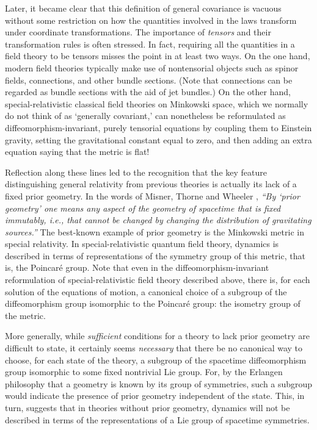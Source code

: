 Later, it became clear that this definition of general covariance
is vacuous without some restriction on how the quantities
involved in the laws transform under coordinate transformations.
The importance of {\it tensors} and their transformation rules is
often stressed.  In fact, requiring all the quantities in a field
theory to be tensors misses the point in at least two ways.  On
the one hand, modern field theories typically make use of
nontensorial objects such as spinor fields, connections, and
other bundle sections. (Note that connections can be regarded as
bundle sections with the aid of jet bundles.)  On the other hand,
special-relativistic classical field theories on Minkowski space,
which we normally do not think of as `generally covariant,' can
nonetheless be reformulated as diffeomorphism-invariant, purely
tensorial equations by coupling them to Einstein gravity, setting
the gravitational constant equal to zero, and then adding an
extra equation saying that the metric is flat!

Reflection along these lines led to the recognition that the key
feature distinguishing general relativity from previous theories
is actually its lack of a fixed prior geometry.  In the words of
Misner, Thorne and Wheeler \cite{MTW}, {\sl ``By `prior geometry'
one means any aspect of the geometry of spacetime that is fixed
immutably, i.e., that cannot be changed by changing the
distribution of gravitating sources.''} The best-known example of
prior geometry is the Minkowski metric in special relativity.  In
special-relativistic quantum field theory, dynamics is described
in terms of representations of the symmetry group of this metric,
that is, the Poincar\'e group. Note that even in the
diffeomorphism-invariant reformulation of special-relativistic
field theory described above, there is, for each solution of the
equations of motion, a canonical choice of a subgroup of the
diffeomorphism group isomorphic to the Poincar\'e group: the
isometry group of the metric.

More generally, while {\it sufficient} conditions for a theory to
lack prior geometry are difficult to state, it certainly seems
{\it necessary} that there be no canonical way to choose, for
each state of the theory, a subgroup of the spacetime
diffeomorphism group isomorphic to some fixed nontrivial Lie
group.  For, by the Erlangen philosophy that a geometry is known
by its group of symmetries, such a subgroup would indicate the
presence of prior geometry independent of the state.  This, in
turn, suggests that in theories without prior geometry, dynamics
will not be described in terms of the representations of a Lie
group of spacetime symmetries.

